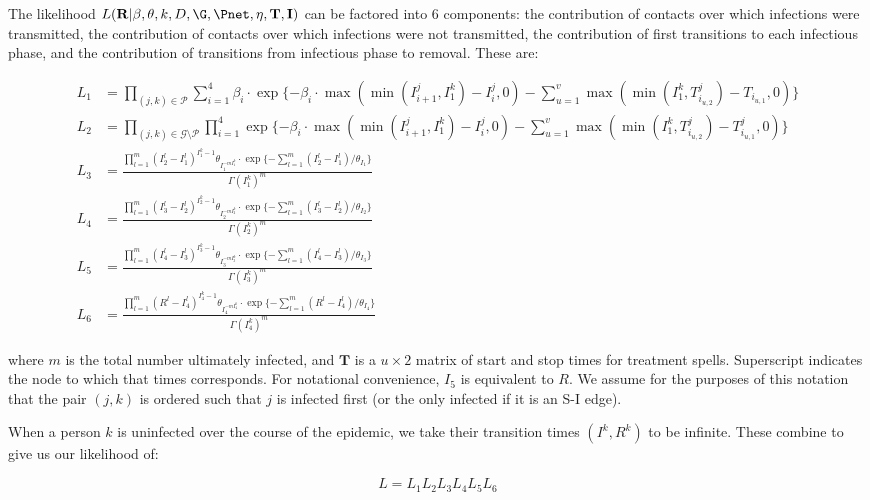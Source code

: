 The likelihood $L(\mathbf{R}| \beta, \theta, k, D, \G, \Pnet, \eta, \mathbf{T}, \mathbf{I})$ can be factored into 6 components: the contribution of contacts over which infections were transmitted, the contribution of contacts over which infections were not transmitted, 
the contribution of first transitions to each infectious phase, and the contribution of transitions from infectious phase to removal. These are:

\begin{align}
L_1 &= \prod_{(j,k) \in \mathscr{P}} \sum_{i=1}^{4} \beta_{i}\cdot \exp \{ -\beta_{i} \cdot \max (\min(I_{i+1}^{j}, I_{1}^{k})-I_{i}^{j},0) - \sum_{u=1}^{v} \max(\min(I_{1}^{k}, T_{i_{u,2}}^{j}) - T_{i_{u,1}} ,0) \}  \label{eq:l1} \\
L_2 &= \prod_{(j,k) \in \mathscr{G} \setminus \mathscr{P}} \prod_{i=1}^{4} \exp\{-\beta_{i}\cdot\max(\min(I_{i+1}^{j}, I_{1}^{k})-I_{i}^{j},0) - \sum_{u=1}^{v} \max(\min(I_{1}^{k}, T_{i_{u,2}}^{j}) - T_{i_{u,1}}^{j} ,0) \}  \label{eq:l2}\\
L_3 &= \frac{\prod_{l=1}^{m}{(I_{2}^{l}-I_{1}^{l})}^{I_{1}^{k}-1}\theta_I_{1}^{-m I_{1}^{k}}\cdot\exp\{{-\sum_{l=1}^{m}(I_{2}^{l}-I_{1}^{l})/\theta_{I_{1}}}\}}{\Gamma(I_{1}^{k})^m} \label{eq:l3} \\
L_4 &= \frac{\prod_{l=1}^{m}{(I_{3}^{l}-I_{2}^{l})}^{I_{2}^{k}-1}\theta_I_{2}^{-m I_{2}^{k}}\cdot\exp\{{-\sum_{l=1}^{m}(I_{3}^{l}-I_{2}^{l})/\theta_{I_{2}}}\}}{\Gamma(I_{2}^{k})^m} \label{eq:l4} \\
L_5 &= \frac{\prod_{l=1}^{m}{(I_{4}^{l}-I_{3}^{l})}^{I_{3}^{k}-1}\theta_I_{3}^{-m I_{3}^{k}}\cdot\exp\{{-\sum_{l=1}^{m}(I_{4}^{l}-I_{3}^{l})/\theta_{I_{3}}}\}}{\Gamma(I_{3}^{k})^m} \label{eq:l5} \\
L_6 &= \frac{\prod_{l=1}^{m}{(R^{l}-I_{4}^{l})}^{I_{4}^{k}-1}\theta_I_{4}^{-m I_{4}^{k}}\cdot\exp\{{-\sum_{l=1}^{m}(R^{l}-I_{4}^{l})/\theta_{I_{4}}}\}}{\Gamma(I_{4}^{k})^m} \label{eq:l6}
\end{align}

where $m$ is the total number ultimately infected, and $\mathbf{T}$ is a $u \times 2$ matrix of start and stop times for treatment spells. Superscript indicates the node to which that times corresponds. For notational convenience, $I_{5}$ is equivalent to $R$. We assume for the purposes of this notation that the pair $(j,k)$ is ordered such that $j$ is infected first (or the only infected if it is an S-I edge).

When a person $k$ is uninfected over the course of the epidemic, we take their transition times $(I^k, R^k)$ to be infinite. These combine to give us our likelihood of:

\begin{equation} \label{eq:lprod}
L = L_1 L_2 L_3 L_4 L_5 L_6
\end{equation}
